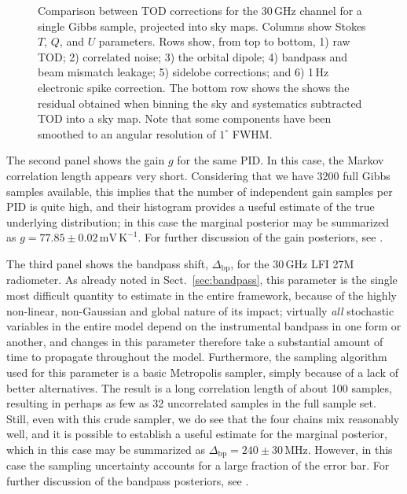 \documentclass[twocolumn]{aa}
\newcommand{\Dbp}[0]{\Delta_{\mathrm{bp}}}
\begin{document}
\begin{figure}[p]
  \caption{Comparison between TOD corrections for the 30\,GHz channel
    for a single Gibbs sample, projected into sky maps. Columns show
    Stokes $T$, $Q$, and $U$ parameters. Rows show, from top to
    bottom, 1) raw TOD; 2) correlated noise; 3) the orbital dipole; 4)
    bandpass and beam mismatch leakage; 5) sidelobe corrections; and
    6) 1\,Hz electronic spike correction. The bottom row shows the
    shows the residual obtained when binning the sky and systematics
    subtracted TOD into a sky map. Note that some components have been
    smoothed to an angular resolution of $1^{\circ}$ FWHM.  }\label{fig:corrmaps}
\end{figure}

The second panel shows the gain $g$ for the same PID. In this case,
the Markov correlation length appears very short. Considering that we
have 3200 full Gibbs samples available, this implies that the number
of independent gain samples per PID is quite high, and their histogram
provides a useful estimate of the true underlying distribution; in
this case the marginal posterior may be summarized as
$g=77.85\pm0.02\,\textrm{mV}\,\mathrm{K}^{-1}$. For further discussion
of the gain posteriors, see \citet{bp07}.

The third panel shows the bandpass shift, $\Dbp$, for the 30\,GHz LFI
27M radiometer. As already noted in Sect.~\ref{sec:bandpass}, this
parameter is the single most difficult quantity to estimate in the
entire framework, because of the highly non-linear, non-Gaussian and
global nature of its impact; virtually \emph{all} stochastic variables
in the entire model depend on the instrumental bandpass in one form or
another, and changes in this parameter therefore take a substantial
amount of time to propagate throughout the model. Furthermore, the
sampling algorithm used for this parameter is a basic Metropolis
sampler, simply because of a lack of better alternatives. The result
is a long correlation length of about 100 samples, resulting in
perhaps as few as 32 uncorrelated samples in the full sample
set. Still, even with this crude sampler, we do see that the four
chains mix reasonably well, and it is possible to establish a useful
estimate for the marginal posterior, which in this case may be
summarized as $\Dbp = 240\pm30\,\textrm{MHz}$. However, in this case
the sampling uncertainty accounts for a large fraction of the error
bar. For further discussion of the bandpass posteriors, see
\citet{bp09}.
\end{document}
